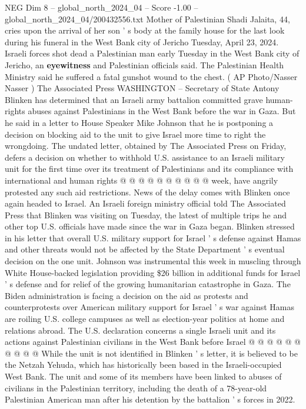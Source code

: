\begin{textsample}{NEG Dim 8 – global\_north\_2024\_04 – Score -1.00 – global\_north\_2024\_04/200432556.txt}  \label{ex:f8_neg_403}
Mother of Palestinian Shadi Jalaita, 44, cries upon the arrival of her son ' s body at the family house for the last look during his funeral in the West Bank city of Jericho Tuesday, April 23, 2024.
Israeli forces shot dead a Palestinian man early Tuesday in the West Bank city of Jericho, an \textbf{eyewitness} and Palestinian officials said.
The Palestinian Health Ministry said he suffered a fatal gunshot wound to the chest. ( AP Photo/Nasser Nasser ) The Associated Press WASHINGTON -- Secretary of State Antony Blinken has determined that an Israeli army battalion committed grave human-rights abuses against Palestinians in the West Bank before the war in Gaza.
But he said in a letter to House Speaker Mike Johnson that he is postponing a decision on blocking aid to the unit to give Israel more time to right the wrongdoing.
The undated letter, obtained by The Associated Press on Friday, defers a decision on whether to withhold U.S. assistance to an Israeli military unit for the first time over its treatment of Palestinians and its compliance with international and human rights @ @ @ @ @ @ @ @ @ @ week, have angrily protested any such aid restrictions.
News of the delay comes with Blinken once again headed to Israel.
An Israeli foreign ministry official told The Associated Press that Blinken was visiting on Tuesday, the latest of multiple trips he and other top U.S. officials have made since the war in Gaza began.
Blinken stressed in his letter that overall U.S. military support for Israel ' s defense against Hamas and other threats would not be affected by the State Department ' s eventual decision on the one unit.
Johnson was instrumental this week in muscling through White House-backed legislation providing \$26 billion in additional funds for Israel ' s defense and for relief of the growing humanitarian catastrophe in Gaza.
The Biden administration is facing a decision on the aid as protests and counterprotests over American military support for Israel ' s war against Hamas are roiling U.S. college campuses as well as election-year politics at home and relations abroad.
The U.S. declaration concerns a single Israeli unit and its actions against Palestinian civilians in the West Bank before Israel @ @ @ @ @ @ @ @ @ @ While the unit is not identified in Blinken ' s letter, it is believed to be the Netzah Yehuda, which has historically been based in the Israeli-occupied West Bank.
The unit and some of its members have been linked to abuses of civilians in the Palestinian territory, including the death of a 78-year-old Palestinian American man after his detention by the battalion ' s forces in 2022.

\end{textsample}
